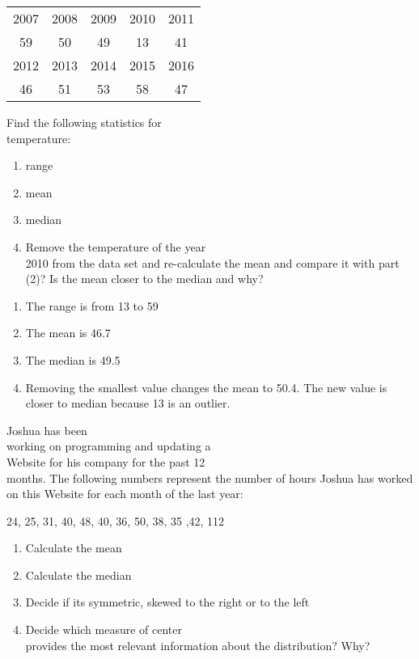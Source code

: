 \documentclass[11pt]{book}\usepackage[]{graphicx}\usepackage[]{color}
\begin{document}
\begin{exercises}
\begin{exercise}
\begin{tabular}{@{} ccccc @{}} \hline
2007 & 2008 & 2009 & 2010 & 2011 \\
59 & 50 & 49 & 13 & 41 \\ \hline
2012 & 2013 & 2014 & 2015 & 2016 \\
46 & 51 & 53 & 58 & 47 \\ \hline
\end{tabular}

Find the following statistics for \\ temperature:

\begin{enumerate}
\item range
\item mean
\item median
\item Remove the temperature of the year \\ 2010 from the data set and re-calculate the mean and compare it with part (2)? Is the mean closer to the median and why?
\end{enumerate}

   \end{exercise}
   \begin{solution} %



\begin{enumerate}
\item The range is from 13 to 59
\item The mean is 46.7
\item The median is 49.5
\item Removing the smallest value changes the mean to 50.4.  The new value is closer to median because 13 is an outlier.
\end{enumerate}
  \end{solution}
 
   \begin{exercise} %



Joshua has been \\ working  on  programming  and updating a \\ Website for his  company for the past 12 \\ months. The following numbers represent the number of hours Joshua  has worked on this Website for each month of the last year:

24, 25, 31, 40, 48, 40, 36, 50, 38, 35 ,42, 112

\begin{enumerate}
\item Calculate the mean
\item Calculate the median
\item Decide if its symmetric, skewed to the right or to the left
\item Decide which measure of center \\ provides the most relevant information about the distribution? Why?
\end{enumerate}


\end{exercise}
\end{exercises}
\end{document}
